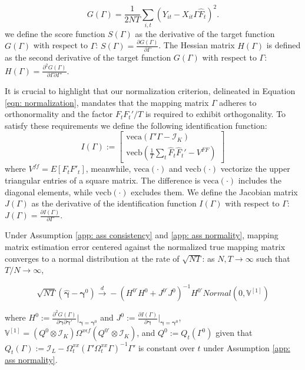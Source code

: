 \documentclass[12pt]{article}
\begin{document}
\begin{equation}
\label{eqn: target}
G(\Gamma) = \frac{1}{2NT}\sum_{i,t} \left( Y_{it} - X_{it}\Gamma \hat{F}_t \right)^2.
\end{equation}
we define the score function $S(\Gamma)$ as the derivative of the target function $G(\Gamma)$ with respect to $\Gamma$: $S(\Gamma) = \frac{\partial G(\Gamma)}{\partial \Gamma}$. The Hessian matrix $H(\Gamma)$ is defined as the second derivative of the target function $G(\Gamma)$ with respect to $\Gamma$: $H(\Gamma) = \frac{\partial^2 G(\Gamma)}{\partial \Gamma \partial \Gamma'}$. 

It is crucial to highlight that our normalization criterion, delineated in Equation \ref{eqn: normalization}, mandates that the mapping matrix $\Gamma$ adheres to orthonormality and the factor $F_t F_t'/T$ is required to exhibit orthogonality. To satisfy these requirements we define the following identification function:
\begin{equation}
\label{eqn: identification}
I(\Gamma) := \begin{bmatrix}
    \text{veca}(\Gamma' \Gamma - \mathcal{I}_K) \\
    \text{vecb}\left(\frac{1}{T} \sum_{t} \hat{F}_t\hat{F}_t' - V^{FF}\right)
    \end{bmatrix}
\end{equation}
where $V^{ff} = E\left[F_t F'_t\right]$, meanwhile, $\text{veca}(\cdot)$ and $\text{vecb}(\cdot)$ vectorize the upper triangular entries of a square matrix. The difference is $\text{veca}(\cdot)$ includes the diagonal elements, while $\text{vecb}(\cdot)$ excludes them. We define the Jacobian matrix $J(\Gamma)$ as the derivative of the identification function $I(\Gamma)$ with respect to $\Gamma$: $J(\Gamma) = \frac{\partial I(\Gamma)}{\partial \Gamma}$.

\begin{proposition}
\label{prop: gamma}
Under Assumption \ref{app: ass consistency} and \ref{app: ass normality}, mapping matrix estimation error centered against the normalized true mapping matrix converges to a normal distribution at the rate of $\sqrt{NT}$: as $N, T \rightarrow \infty$ such that $T/N \rightarrow \infty$,

$$
\sqrt{NT} \left( \hat{\bm{\gamma}} - \bm{\gamma}^0 \right) \xrightarrow{d} - \left( H^{0'}H^0 + J^{0'}J^0 \right)^{-1}H^{0'}Normal(0, \mathbb{V}^{[1]})
$$
\end{proposition}
where $H^0:= \frac{\partial^2 G(\Gamma)}{\partial \bm{\gamma}\partial \bm{\gamma}'}|_{\bm{\gamma} = \bm{\gamma}^0}$ and $J^0:= \frac{\partial I(\Gamma)}{\partial \bm{\gamma}}|_{\bm{\gamma} = \bm{\gamma}^0}$, $\mathbb{V}^{[1]} = \left( Q^0 \otimes \mathcal{I}_K \right) \Omega^{x\epsilon f} \left( Q^{0'} \otimes \mathcal{I}_K \right)$, and $Q^0 := Q_t(\Gamma^0)$ given that $Q_t(\Gamma) := \mathcal{I}_L - \Omega_t^{xx} \left( \Gamma' \Omega^{xx}_t \Gamma \right)^{-1}\Gamma'$ is constant over $t$ under Assumption \ref{app: ass normality}.
\end{document}
